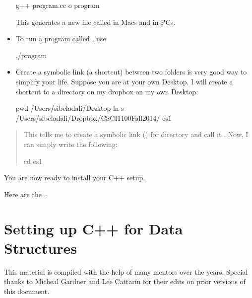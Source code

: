 \documentclass[letterpaper,10pt,english]{sphinxmanual}
\begin{document}
\begin{itemize}
%
\begin{sphinxVerbatim}[commandchars=\\\{\}]
\PYGZdl{} g++ program.cc \PYGZhy{}o program
\end{sphinxVerbatim}

This generates a new file called  in Macs and 
in PCs.

\item {} 
To run a program called , use:

%
\begin{sphinxVerbatim}[commandchars=\\\{\}]
\PYGZdl{} ./program
\end{sphinxVerbatim}

\item {} 
Create a symbolic link (a shortcut) between two folders is very good
way to simplify your life. Suppose you are at your own Desktop. I
will create a shortcut to a directory on my dropbox on my own
Desktop:

%
\begin{sphinxVerbatim}[commandchars=\\\{\}]
\PYGZdl{} pwd
/Users/sibeladali/Desktop
\PYGZdl{} ln \PYGZhy{}s /Users/sibeladali/Dropbox/CSCI1100\PYGZus{}Fall2014/ cs1
\end{sphinxVerbatim}

\end{itemize}
\begin{quote}

This tells me to create a symbolic link () for
directory  and call
it . Now, I can simply write the following:

%
\begin{sphinxVerbatim}[commandchars=\\\{\}]
\PYGZdl{} cd cs1
\end{sphinxVerbatim}
\end{quote}

You are now ready to install your C++ setup.

Here are the .


\chapter{Setting up C++ for Data Structures}
\label{\detokenize{lecture_notes/setting_up_for_ds:setting-up-c-for-data-structures}}\label{\detokenize{lecture_notes/setting_up_for_ds::doc}}
This material is compiled with the help of many mentors over the
years. Special thanks to Micheal Gardner and Lee Cattarin for their
edits on prior versions of this document.
\end{document}
